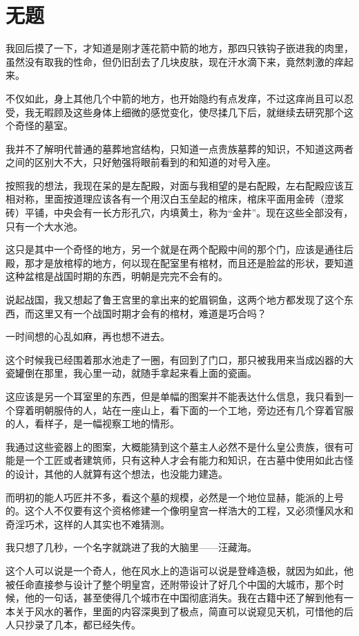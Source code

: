\chapter{无题}

我回后摸了一下，才知道是刚才莲花箭中箭的地方，那四只铁钩子嵌进我的肉里，虽然没有取我的性命，但仍旧刮去了几块皮肤，现在汗水滴下来，竟然刺激的痒起来。

不仅如此，身上其他几个中箭的地方，也开始隐约有点发痒，不过这痒尚且可以忍受，我无暇顾及这些身体上细微的感觉变化，使尽揉几下后，就继续去研究那个这个奇怪的墓室。

我并不了解明代普通的墓葬地宫结构，只知道一点贵族墓葬的知识，不知道这两者之间的区别大不大，只好勉强将眼前看到的和知道的对号入座。

按照我的想法，我现在呆的是左配殿，对面与我相望的是右配殿，左右配殿应该互相对称，里面按道理应该各有一个用汉白玉垒起的棺床，棺床平面用金砖（澄浆砖）平铺，中央会有一长方形孔穴，内填黄土，称为“金井”。现在这些全部没有，只有一个大水池。

这只是其中一个奇怪的地方，另一个就是在两个配殿中间的那个门，应该是通往后殿，那才是放棺椁的地方，何以现在配室里有棺材，而且还是脸盆的形状，要知道这种盆棺是战国时期的东西，明朝是完完不会有的。

说起战国，我又想起了鲁王宫里的拿出来的蛇眉铜鱼，这两个地方都发现了这个东西，而这里又有一个战国时期才会有的棺材，难道是巧合吗？

一时间想的心乱如麻，再也想不进去。

这个时候我已经围着那水池走了一圈，有回到了门口，那只被我用来当成凶器的大瓷罐倒在那里，我心里一动，就随手拿起来看上面的瓷画。

这应该是另一个耳室里的东西，但是单幅的图案并不能表达什么信息，我只看到一个穿着明朝服侍的人，站在一座山上，看下面的一个工地，旁边还有几个穿着官服的人，看样子，是一幅视察工地的情形。

我通过这些瓷器上的图案，大概能猜到这个墓主人必然不是什么皇公贵族，很有可能是一个工匠或者建筑师，只有这种人才会有能力和知识，在古墓中使用如此古怪的设计，其他的人就算有这个想法，也没能力建造。

而明初的能人巧匠并不多，看这个墓的规模，必然是一个地位显赫，能派的上号的。这个人不仅要有这个资格修建一个像明皇宫一样浩大的工程，又必须懂风水和奇淫巧术，这样的人其实也不难猜测。

我只想了几秒，一个名字就跳进了我的大脑里——汪藏海。

这个人可以说是一个奇人，他在风水上的造诣可以说是登峰造极，就因为如此，他被任命直接参与设计了整个明皇宫，还附带设计了好几个中国的大城市，那个时候，他的一句话，甚至使得几个城市在中国彻底消失。我在古籍中还了解到他有一本关于风水的著作，里面的内容深奥到了极点，简直可以说窥见天机，可惜他的后人只抄录了几本，都已经失传。

